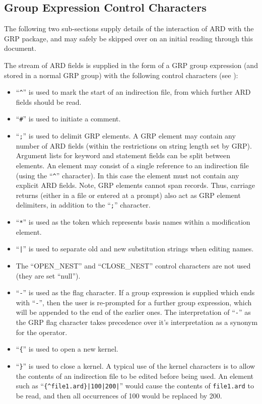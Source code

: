 \documentclass[11pt]{starlink}
\begin{document}
\subsection{\label{SEC:GRPCC}Group Expression Control Characters}
The following two sub-sections supply details of the interaction of ARD with the
GRP package, and may safely be skipped over on an initial reading through this
document.

The stream of ARD fields is supplied in the form of a GRP group expression (and
stored in a normal GRP group) with the following control characters (see
):

\begin{itemize}

\item ``\verb+^+'' is used to mark the start of an indirection file, from which
further ARD fields should be read.

\item ``\verb+#+'' is used to initiate a comment.

\item ``\verb+;+'' is used to delimit GRP elements. A GRP element may contain
any
number of ARD fields (within the restrictions on string length set by GRP).
Argument lists for keyword and statement fields can be split between elements.
An element may consist of a single reference to an indirection file (using the
``\verb+^+'' character). In this case the element must not contain any
explicit ARD fields. Note, GRP elements cannot span records. Thus,
carriage returns (either in a file or entered at a prompt) also act as GRP
element delimiters, in addition to the ``\verb+;+'' character.

\item ``\verb+*+'' is used as the token which represents basis names
within a modification element.

\item ``\verb+|+'' is used to separate old and new substitution strings
when editing names.

\item The ``OPEN\_NEST'' and ``CLOSE\_NEST'' control characters are not used
(they are set ``null'').

\item ``\verb+-+'' is used as the flag character. If a group expression is
supplied which ends with ``\verb+-+'', then the user is re-prompted for a
further group expression, which will be appended to the end of the earlier ones.
The interpretation of ``\verb+-+'' as the GRP flag character takes precedence
over it's interpretation as a synonym for the  operator.

\item ``\verb+{+'' is used to open a new kernel.

\item ``\verb+}+'' is used to close a kernel. A typical use of the kernel
characters is to allow the contents of an indirection file to be edited before
being used. An element such as ``\verb+{^file1.ard}|100|200|+'' would cause the
contents of \verb+file1.ard+ to be read, and then all occurrences of 100 would
be replaced by 200.

\end{itemize}
\end{document}
